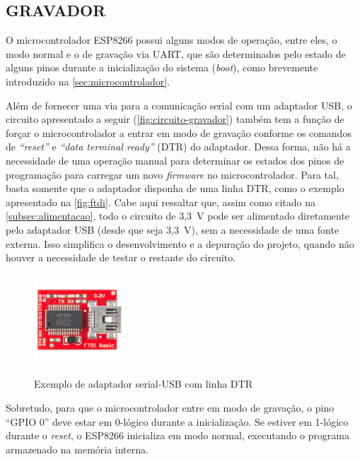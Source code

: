 \subsection{GRAVADOR}
\label{subsec:gravador}

O microcontrolador ESP8266 possui alguns modos de operação, entre eles, o modo normal e o de gravação via UART, que são determinados pelo estado de alguns pinos durante a inicialização do sistema (\emph{boot}), como brevemente introduzido na \autoref{sec:microcontrolador}.

Além de fornecer uma via para a comunicação serial com um adaptador USB, o circuito apresentado a seguir (\autoref{fig:circuito-gravador}) também tem a função de forçar o microcontrolador a entrar em modo de gravação conforme os comandos de \emph{``reset''} e \emph{``data terminal ready''} (DTR) do adaptador. Dessa forma, não há a necessidade de uma operação manual para determinar os estados dos pinos de programação para carregar um novo \emph{firmware} no microcontrolador. Para tal, basta somente que o adaptador disponha de uma linha DTR, como o exemplo apresentado na \autoref{fig:ftdi}. Cabe aqui ressaltar que, assim como citado na \autoref{subsec:alimentacao}, todo o circuito de {3,3\ V} pode ser alimentado diretamente pelo adaptador USB (desde que seja {3,3\ V}), sem a necessidade de uma fonte externa. Isso simplifica o desenvolvimento e a depuração do projeto, quando não houver a necessidade de testar o restante do circuito.

\begin{figure}[H]
    \centering
    \caption{Exemplo de adaptador serial-USB com linha DTR}
    \includegraphics[width=0.3\textwidth]{./dados/figuras/ftdi}
    \label{fig:ftdi}
\end{figure}

Sobretudo, para que o microcontrolador entre em modo de gravação, o pino ``GPIO 0'' deve estar em 0-lógico durante a inicialização. Se estiver em 1-lógico durante o \emph{reset}, o ESP8266 inicializa em modo normal, executando o programa armazenado na memória interna.

